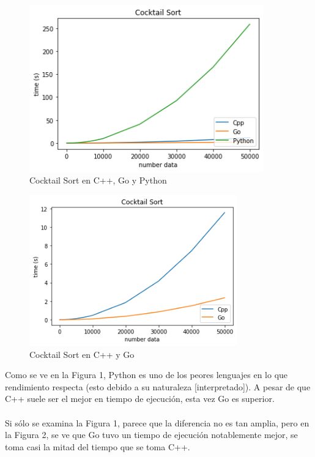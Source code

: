 \documentclass[https://www.overleaf.com/project/63761df255a8a9f4a15c3579
	letterpaper, %
	10pt, %
]{CSUniSchoolLabReport}
\begin{document}
\begin{figure}[H] 
	\centering 
	\includegraphics[width=0.9\textwidth]{Figures/cocktailSort.png} %
	\caption{Cocktail Sort en C++, Go y Python}
\end{figure}

\begin{figure}[H] 
	\centering 
	\includegraphics[width=0.8\textwidth]{Figures/cocktailSort2.png} %
	\caption{Cocktail Sort en C++ y Go}
\end{figure}

Como se ve en la  Figura 1, Python es uno de los peores lenguajes en lo que rendimiento respecta (esto debido a su naturaleza [interpretado]). A pesar de que C++ suele ser el mejor en tiempo de ejecución, esta vez Go es superior. \\\\
Si sólo se examina la Figura 1, parece que la diferencia no es tan amplia, pero en la Figura 2, se ve que Go tuvo un tiempo de ejecución notablemente mejor, se toma casi la mitad del tiempo que se toma C++.
\end{document}

